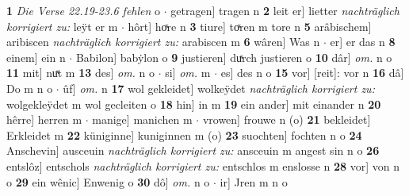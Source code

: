 \documentclass[8pt,a4paper,notitlepage]{article}
\begin{document}
\begin{table}[ht]
\begin{minipage}[t]{0.5\linewidth}
\textbf{1} \textit{Die Verse 22.19-23.6 fehlen} o   $\cdot$ getragen] tragen n \textbf{2} leit er] lietter \textit{nachträglich korrigiert zu:} leÿt er m  $\cdot$ hôrt] hoͯre n \textbf{3} tiure] toͯren m tore n \textbf{5} arâbischem] aribiscen \textit{nachträglich korrigiert zu:} arabiscen m \textbf{6} wâren] Was n  $\cdot$ er] er das n \textbf{8} einem] ein n  $\cdot$ Babilon] babẏlon o \textbf{9} justieren] duͯrch justieren o \textbf{10} dâr] \textit{om.} n o \textbf{11} mit] nuͯt m \textbf{13} des] \textit{om.} n o  $\cdot$ si] \textit{om.} m  $\cdot$ es] des n o \textbf{15} vor] [reit]: vor n \textbf{16} dâ] Do m n o  $\cdot$ ûf] \textit{om.} n \textbf{17} wol gekleidet] wolkeÿdet \textit{nachträglich korrigiert zu:} wolgekleÿdet m wol gecleiten o \textbf{18} hin] in m \textbf{19} ein ander] mit einander n \textbf{20} hêrre] herren m  $\cdot$ manige] manichen m  $\cdot$ vrowen] frouwe n (o) \textbf{21} bekleidet] Erkleidet m \textbf{22} küniginne] kuniginnen m (o) \textbf{23} suochten] fochten n o \textbf{24} Anschevin] ausceuin \textit{nachträglich korrigiert zu:} ansceuin m angest sin n o \textbf{26} entslôz] entschols \textit{nachträglich korrigiert zu:} entschlos m enslosse n \textbf{28} vor] von n o \textbf{29} ein wênic] Enwenig o \textbf{30} dô] \textit{om.} n o  $\cdot$ ir] Jren m n o \newline
\end{minipage}
\end{table}
\newpage
\end{document}
